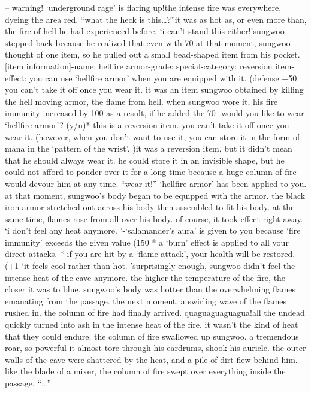 – warning! ‘underground rage’ is flaring up!the intense fire was everywhere, dyeing the area red.
“what the heck is this…?”it was as hot as, or even more than, the fire of hell he had experienced before.
‘i can’t stand this either!’sungwoo stepped back because he realized that even with 70%
at that moment, sungwoo thought of one item, so he pulled out a small bead-shaped item from his pocket.
[item information]-name: hellfire armor-grade: special-category: reversion item-effect: you can use ‘hellfire armor’ when you are equipped with it.
 (defense +50%
 you can’t take it off once you wear it.
it was an item sungwoo obtained by killing the hell moving armor, the flame from hell.
when sungwoo wore it, his fire immunity increased by 100%
 as a result, if he added the 70%
-would you like to wear ‘hellfire armor’? (y/n)* this is a reversion item.
 you can’t take it off once you wear it.
 (however, when you don’t want to use it, you can store it in the form of mana in the ‘pattern of the wrist’.
)it was a reversion item, but it didn’t mean that he should always wear it.
 he could store it in an invisible shape, but he could not afford to ponder over it for a long time because a huge column of fire would devour him at any time.
“wear it!”-‘hellfire armor’ has been applied to you.
at that moment, sungwoo’s body began to be equipped with the armor.
the black iron armor stretched out across his body then assembled to fit his body.
at the same time, flames rose from all over his body.
 of course, it took effect right away.
‘i don’t feel any heat anymore.
’-‘salamander’s aura’ is given to you because ‘fire immunity’ exceeds the given value (150%
* a ‘burn’ effect is applied to all your direct attacks.
* if you are hit by a ‘flame attack’, your health will be restored.
 (+1%
‘it feels cool rather than hot.
’surprisingly enough, sungwoo didn’t feel the intense heat of the cave anymore.
the higher the temperature of the fire, the closer it was to blue.
 sungwoo’s body was hotter than the overwhelming flames emanating from the passage.
the next moment, a swirling wave of the flames rushed in.
 the column of fire had finally arrived.
quaguaguaguagua!all the undead quickly turned into ash in the intense heat of the fire.
 it wasn’t the kind of heat that they could endure.
the column of fire swallowed up sungwoo.
 a tremendous roar, so powerful it almost tore through his eardrums, shook his auricle.
 the outer walls of the cave were shattered by the heat, and a pile of dirt flew behind him.
 like the blade of a mixer, the column of fire swept over everything inside the passage.
“…”

